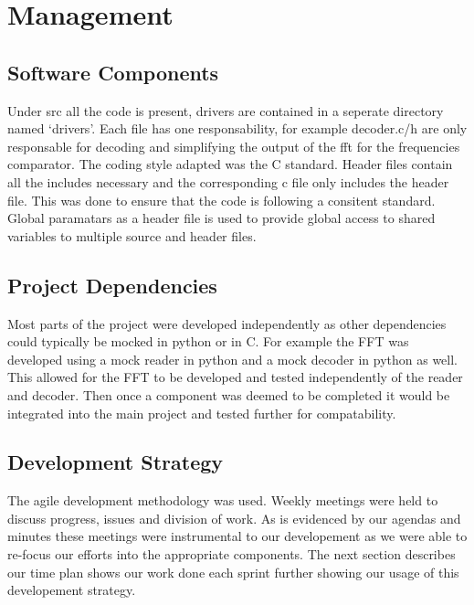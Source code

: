 \documentclass{cce2014-design}
\begin{document}
\section{Management}
 {
  \subsection{Software Components}
  {
	  Under src all the code is present, drivers are contained in a
	  seperate directory named `drivers'. Each file has one responsability,
	  for
	  example decoder.c/h
	  are only responsable for decoding and simplifying the output of the
	  fft for the frequencies comparator. The coding style adapted was the
	  C
	  standard.
	  Header files contain all the includes necessary and the corresponding
	  c file only includes the header file. This was done to ensure that
	  the code is
	  following a consitent standard. Global paramatars as a header file is
	  used to provide global access to shared variables to multiple source
	  and header
	  files.
  }

  \subsection{Project Dependencies}
  {
	  Most parts of the project were developed independently as other
	  dependencies could typically be mocked in python or in C.
	  For example the FFT was developed using a mock reader in python and a
	  mock decoder in python as well. This allowed for the FFT to be
	  developed and
	  tested independently of the reader and decoder. Then once a component
	  was deemed to be completed it would be integrated into the main
	  project and
	  tested further for compatability.
  }
  \subsection{Development Strategy}
  {
	  The agile development methodology was used.
	  Weekly meetings were held to discuss progress, issues and division of
	  work.
	  As is evidenced by our agendas and minutes these meetings were
	  instrumental
	  to our developement as we were able to re-focus our efforts into the
	  appropriate components. The next section describes our time plan
	  shows
	  our work done each sprint further showing our usage of this
	  developement strategy.
  }
}
\end{document}
